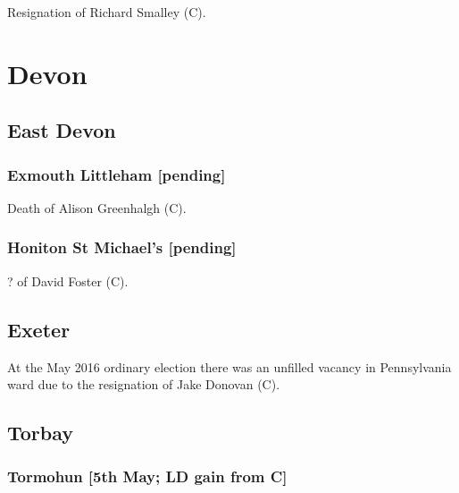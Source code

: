 \documentclass[a4paper,openany]{book}
\begin{document}
\begin{resultsiii}

Resignation of Richard Smalley (C).

\section{Devon}

\subsection*{East Devon}

\subsubsection*{Exmouth Littleham \hspace*{\fill}\nolinebreak[1]%
\enspace\hspace*{\fill}
[pending]}


Death of Alison Greenhalgh (C).

\subsubsection*{Honiton St Michael's \hspace*{\fill}\nolinebreak[1]%
\enspace\hspace*{\fill}
[pending]}


? of David Foster (C).

\subsection*{Exeter}

At the May 2016 ordinary election there was an unfilled vacancy in Pennsylvania ward due to the resignation of Jake Donovan (C).

\subsection*{Torbay}

\subsubsection*{Tormohun \hspace*{\fill}\nolinebreak[1]%
\enspace\hspace*{\fill}
[5th May; LD gain from C]}


\end{resultsiii}
\end{document}
